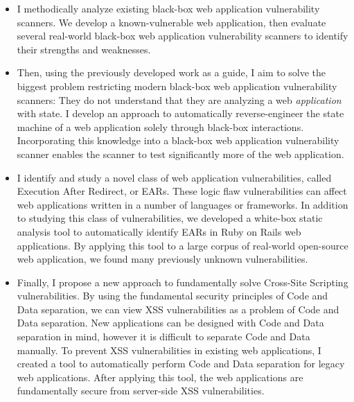 \begin{itemize}

\item I methodically analyze existing black-box web application
  vulnerability scanners. We develop a known-vulnerable web
  application, then evaluate several real-world black-box web
  application vulnerability scanners to identify their strengths and
  weaknesses.

\item Then, using the previously developed work as a guide, I aim to
  solve the biggest problem restricting modern black-box web
  application vulnerability scanners: They do not understand that they
  are analyzing a web \emph{application} with state. I develop an
  approach to automatically reverse-engineer the state machine of a
  web application solely through black-box interactions. Incorporating
  this knowledge into a black-box web application vulnerability
  scanner enables the scanner to test significantly more of the web
  application.

\item I identify and study a novel class of web application
  vulnerabilities, called Execution After Redirect, or EARs. These
  logic flaw vulnerabilities can affect web applications written in a
  number of languages or frameworks. In addition to studying this
  class of vulnerabilities, we developed a white-box static analysis
  tool to automatically identify EARs in Ruby on Rails web
  applications. By applying this tool to a large corpus of real-world
  open-source web application, we found many previously unknown
  vulnerabilities.

\item Finally, I propose a new approach to fundamentally solve
  Cross-Site Scripting vulnerabilities. By using the fundamental
  security principles of Code and Data separation, we can view XSS
  vulnerabilities as a problem of Code and Data separation. New
  applications can be designed with Code and Data separation in mind,
  however it is difficult to separate Code and Data manually. To
  prevent XSS vulnerabilities in existing web applications, I created
  a tool to automatically perform Code and Data separation for legacy
  web applications. After applying this tool, the web applications are
  fundamentally secure from server-side XSS vulnerabilities.

\end{itemize}





